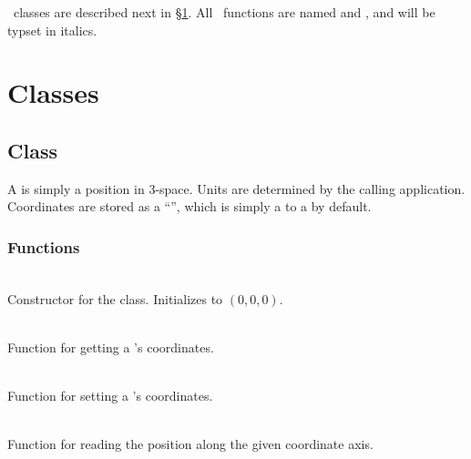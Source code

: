 \documentclass[11pt]{article}
\begin{document}
\amrSolve\ classes are described next in \S\ref{s:amrsolve}.
All \amrLeech\ functions are named  and , 
and will be typset in italics.

\section{Classes} \label{s:amrsolve}

\subsection{ Class} \label{s:point}

   A  is simply a position in $3$-space.  Units are
   determined by the calling application.  Coordinates are stored as
   a ``'', which is simply a  to a
    by default.

   \umlPoint

\subsubsection{ Functions}

     \\
    Constructor for the  class.  Initializes to $(0,0,0)$.

     \\
    Function for getting a 's coordinates.

     \\
    Function for setting a 's coordinates.

     \\ Function for reading
    the  position along the given coordinate axis.
\end{document}
